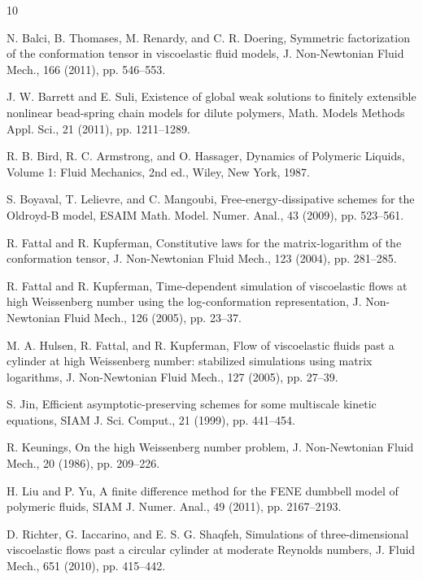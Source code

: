 ﻿\documentclass[11pt]{amsart}
\begin{document}
\begin{thebibliography}{10}

N. Balci, B. Thomases, M. Renardy, and C. R. Doering,
\newblock Symmetric factorization of the conformation tensor in viscoelastic fluid models,
\newblock J. Non-Newtonian Fluid Mech., 166 (2011), pp. 546--553.

J. W. Barrett and E. Suli,
\newblock Existence of global weak solutions to finitely extensible nonlinear bead-spring chain models for dilute polymers,
\newblock Math. Models Methods Appl. Sci., 21 (2011), pp. 1211--1289.

R. B. Bird, R. C. Armstrong, and O. Hassager,
\newblock Dynamics of Polymeric Liquids, Volume 1: Fluid Mechanics,
\newblock 2nd ed., Wiley, New York, 1987.

S. Boyaval, T. Lelievre, and C. Mangoubi,
\newblock Free-energy-dissipative schemes for the Oldroyd-B model,
\newblock ESAIM Math. Model. Numer. Anal., 43 (2009), pp. 523--561.

R. Fattal and R. Kupferman,
\newblock Constitutive laws for the matrix-logarithm of the conformation tensor,
\newblock J. Non-Newtonian Fluid Mech., 123 (2004), pp. 281--285.

R. Fattal and R. Kupferman,
\newblock Time-dependent simulation of viscoelastic flows at high Weissenberg number using the log-conformation representation,
\newblock J. Non-Newtonian Fluid Mech., 126 (2005), pp. 23--37.

M. A. Hulsen, R. Fattal, and R. Kupferman,
\newblock Flow of viscoelastic fluids past a cylinder at high Weissenberg number: stabilized simulations using matrix logarithms,
\newblock J. Non-Newtonian Fluid Mech., 127 (2005), pp. 27--39.

S. Jin,
\newblock Efficient asymptotic-preserving schemes for some multiscale kinetic equations,
\newblock SIAM J. Sci. Comput., 21 (1999), pp. 441--454.

R. Keunings,
\newblock On the high Weissenberg number problem,
\newblock J. Non-Newtonian Fluid Mech., 20 (1986), pp. 209--226.

H. Liu and P. Yu,
\newblock A finite difference method for the FENE dumbbell model of polymeric fluids,
\newblock SIAM J. Numer. Anal., 49 (2011), pp. 2167--2193.

D. Richter, G. Iaccarino, and E. S. G. Shaqfeh,
\newblock Simulations of three-dimensional viscoelastic flows past a circular cylinder at moderate Reynolds numbers,
\newblock J. Fluid Mech., 651 (2010), pp. 415--442.

\end{thebibliography}
\end{document}
